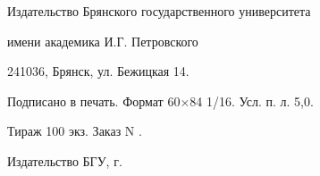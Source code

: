 \documentclass[14pt,a4paper, oneside]{memoir}
\numberwithin{equation}{section} %
\begin{document}

Издательство Брянского государственного университета

имени академика И.Г. Петровского

241036, Брянск, ул. Бежицкая 14.


Подписано в печать. Формат 60×84 1/16. Усл. п. л. 5,0.

Тираж 100 экз. Заказ N .

\textcopyright Издательство БГУ, \the\year г.
\clearpage












\end{document}
